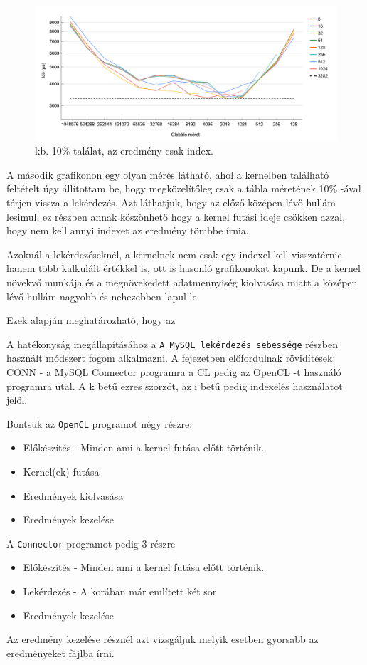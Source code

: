 \begin{figure}[h!]
\centering
\includegraphics[width=\textwidth]{images/gs_1_10.png}
\caption{kb. 10\% találat, az eredmény csak index.}
\label{fig:schema}
\end{figure}
A második grafikonon egy olyan mérés látható, ahol a kernelben található feltételt úgy állítottam be, hogy megközelítőleg csak a tábla méretének 10\% -ával térjen vissza a lekérdezés.
Azt láthatjuk, hogy az előző középen lévő hullám lesimul, ez részben annak köszönhető hogy a kernel futási ideje csökken azzal, hogy nem kell annyi indexet az eredmény tömbbe írnia.


Azoknál a lekérdezéseknél, a kernelnek nem csak egy indexel kell visszatérnie hanem több kalkulált értékkel is, ott is hasonló grafikonokat kapunk. De a kernel növekvő munkája és a megnövekedett adatmennyiség kiolvasása miatt a középen lévő hullám nagyobb és nehezebben lapul le.

Ezek alapján meghatározható, hogy az 
\newpage
{}

A hatékonyság megállapításához a \texttt{A MySQL lekérdezés sebessége} részben használt módszert fogom alkalmazni.
A fejezetben előfordulnak rövidítések: CONN - a MySQL Connector programra a CL pedig az OpenCL -t használó programra utal. 
A k betű ezres szorzót, az i betű pedig indexelés használatot jelöl.

Bontsuk az \texttt{OpenCL} programot négy részre:
\begin{itemize}
\item Előkészítés - Minden ami a kernel futása előtt történik.
\item Kernel(ek) futása
\item Eredmények kiolvasása
\item Eredmények kezelése
\end{itemize}
A \texttt{Connector} programot pedig 3 részre
\begin{itemize}
\item Előkészítés - Minden ami a kernel futása előtt történik.
\item Lekérdezés - A korában már említett két sor
\item Eredmények kezelése
\end{itemize}
Az eredmény kezelése résznél azt vizsgáljuk melyik esetben gyorsabb az eredményeket fájlba írni.
\newpage
{}

